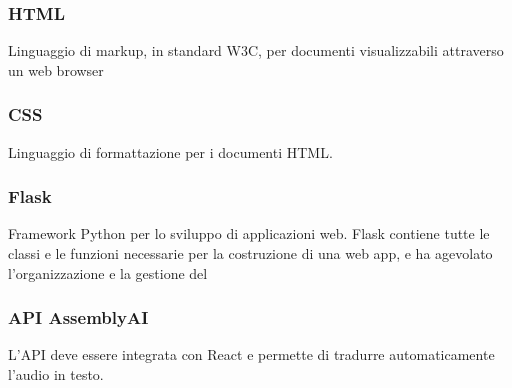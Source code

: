 \subsubsection{HTML}
Linguaggio di markup, in standard W3C, per documenti visualizzabili attraverso un web browser
\subsubsection{CSS}
Linguaggio di formattazione per i documenti HTML.
\subsubsection{Flask}
Framework Python per lo sviluppo di applicazioni web. Flask contiene tutte le classi e le funzioni necessarie per la costruzione di una web app, e ha agevolato l'organizzazione e la gestione del 
\subsubsection{API AssemblyAI}
L'API deve essere integrata con React e permette di tradurre automaticamente l'audio in testo.
\newpage